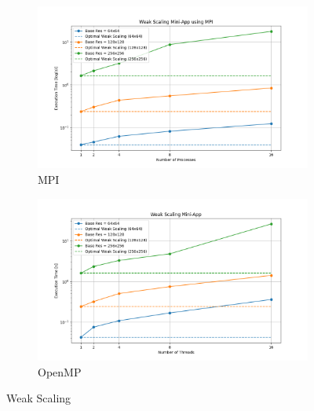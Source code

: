 \begin{figure}[H]
	\centering
	\begin{subfigure}{0.8\textwidth}
		\includegraphics[width=\textwidth]{./media/weak_scaling.png}
		\caption{MPI}
		\label{fig:mpi-weak}
	\end{subfigure}
	\begin{subfigure}{0.8\textwidth}
		\includegraphics[width=\textwidth]{./media/weak_scaling_omp.png}
		\caption{OpenMP}
		\label{fig:openmp-weak}
	\end{subfigure}
	\caption{Weak Scaling}
	\label{fig:weak_scaling}
\end{figure}
